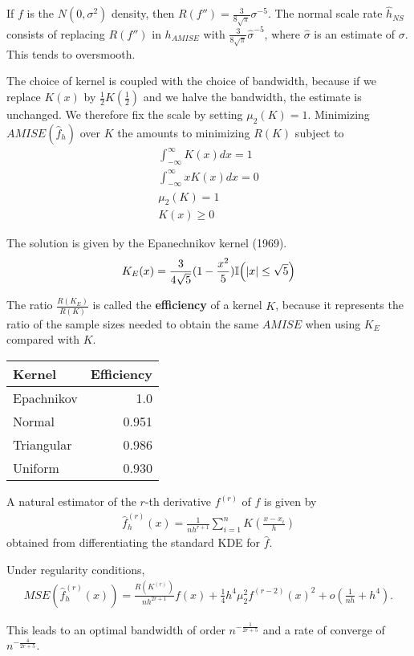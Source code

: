 \begin{thm}
  If $f$ is the $N(0, \sigma^{2})$ density, then $R(f'') = \frac{3}{8
    \sqrt{\pi}} \sigma^{-5}$. The normal scale rate $\hat h_{NS}$
  consists of replacing $R(f'')$ in $h_{AMISE}$ with $\frac{3}{8
    \sqrt{\pi}} \hat \sigma^{-5}$, where $\hat \sigma$ is an estimate
  of $\sigma$. This tends to oversmooth.
\end{thm}

The choice of kernel is coupled with the choice of bandwidth, because
if we replace $K(x)$ by $\frac{1}{2} K(\frac{1}{2})$ and we halve the
bandwidth, the estimate is unchanged.  We therefore fix the scale by
setting $\mu_{2}(K) = 1$.  Minimizing $AMISE(\hat f_{h})$ over $K$ the
amounts to minimizing $R(K)$ subject to
\begin{align}
  \label{eq:40}
  \int_{-\infty}^{\infty} K(x) dx = 1 \\
  \int_{-\infty}^{\infty} x K(x) dx = 0 \\
  \mu_{2}(K) = 1 \\
  K(x) \geq 0
\end{align}

The solution is given by the Epanechnikov kernel (1969).
\begin{align}
  \label{eq:41}
  K_{E}(x) = \frac{3}{4 \sqrt{5}}(1 - \frac{x^{2}}{5}) \I{|x| \leq \sqrt{5}}
\end{align}

The ratio $\frac{R(K_{E})}{R(K)}$ is called the \textbf{efficiency} of
a kernel $K$, because it represents the ratio of the sample sizes
needed to obtain the same $AMISE$ when using $K_{E}$ compared with $K$.


\begin{center}
\begin{tabular}{lr}
Kernel & Efficiency \\
\hline
Epachnikov & 1.0 \\
Normal & 0.951 \\
Triangular & 0.986 \\
Uniform & 0.930 \\
\end{tabular}
\end{center}

\begin{thm}
  A natural estimator of the $r$-th derivative $f^{(r)}$ of $f$ is given
by
\begin{align}
  \label{eq:33}
  \hat f^{(r)}_{h}(x) = \frac{1}{n h^{r+1}} \sum_{i=1}^{n} K(\frac{x -
  x_{i}}{h})
\end{align}
obtained from differentiating the standard KDE for $\hat f$.

Under regularity conditions,
\begin{align}
  \label{eq:39}
  MSE(\hat f^{(r)}_{h}(x)) = \frac{R(K^{(r)})}{nh^{2r+1}}f(x) +
  \frac{1}{4} h^{4} \mu_{2}^{2} f^{(r-2)}(x)^{2} + o(\frac{1}{nh} + h^{4}).
\end{align}

This leads to an optimal bandwidth of order $n^{-\frac{1}{2r + 5}}$
and a rate of converge of $n^{-\frac{4}{2r+5}}$.

\end{thm}

